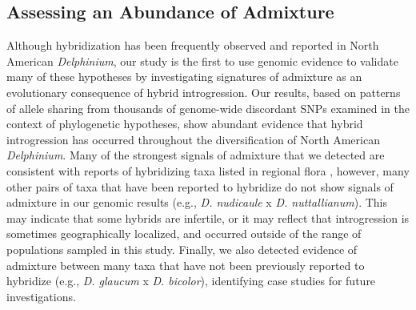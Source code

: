 \documentclass[11pt]{article}
\begin{document}
\subsection{Assessing an Abundance of Admixture}
Although hybridization has been frequently observed and reported in North American 
\emph{Delphinium}, our study is the first to use genomic evidence to validate 
many of these hypotheses by investigating signatures of admixture as an evolutionary consequence of hybrid introgression.
% 
Our results, based on patterns of allele sharing from thousands of genome-wide 
discordant SNPs examined in the context of phylogenetic hypotheses, show abundant 
evidence that hybrid introgression has occurred throughout the diversification of
North American \emph{Delphinium}. 
% 
Many of the strongest signals of admixture that we detected are consistent with
reports of hybridizing taxa listed in regional flora
\citep[e.g., \emph{D. patens} x \emph{D. nudicaule}; \emph{D. nuttallianum} x \emph{D. andersonii};][]{hickman1993jepson, Warnock_1997_FNA_Delphinium}, however, many other 
pairs of taxa that have been reported to hybridize do not show signals of 
admixture in our genomic results (e.g., \emph{D. nudicaule} x \emph{D. nuttallianum}).
This may indicate that some hybrids are infertile, or it may reflect that introgression is sometimes geographically localized, and occurred outside of the range of populations sampled in this study.
% 
Finally, we also detected evidence of admixture between many taxa that have not been 
previously reported to hybridize (e.g., \emph{D. glaucum} x \emph{D. bicolor}), 
identifying case studies for future investigations.
\end{document}
